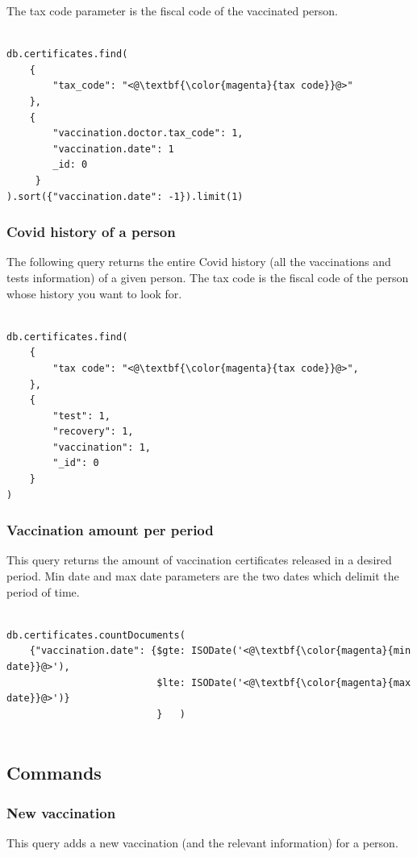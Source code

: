\documentclass{article}
\begin{document}
The tax code parameter is the fiscal code of the vaccinated person.

\begin{lstlisting}[language=cypher, label=lst:cypher-example]

db.certificates.find(
    {
        "tax_code": "<@\textbf{\color{magenta}{tax code}}@>"
    },
    {
        "vaccination.doctor.tax_code": 1,
        "vaccination.date": 1
        _id: 0
     }
).sort({"vaccination.date": -1}).limit(1)

\end{lstlisting}
\subsubsection{Covid history of a person}
The following query returns the entire Covid history (all the vaccinations and tests information) of a given person.
The tax code is the fiscal code of the person whose history you want to look for.

\begin{lstlisting}[language=cypher, label=lst:cypher-example]

db.certificates.find(
    {
        "tax code": "<@\textbf{\color{magenta}{tax code}}@>",
    },
    {
        "test": 1,
        "recovery": 1,
        "vaccination": 1,
        "_id": 0
    }
)

\end{lstlisting}
\subsubsection{Vaccination amount per period}
This query returns the amount of vaccination certificates released in a desired period. Min date and max date parameters are the two dates which delimit the period of time.

\begin{lstlisting}[language=cypher, label=lst:cypher-example]

db.certificates.countDocuments(
    {"vaccination.date": {$gte: ISODate('<@\textbf{\color{magenta}{min date}}@>'),
                          $lte: ISODate('<@\textbf{\color{magenta}{max date}}@>')}
                          }   )


\end{lstlisting}
\newpage
\subsection{Commands}
\subsubsection{New vaccination}
This query adds a new vaccination (and the relevant information) for a person.
\end{document}
